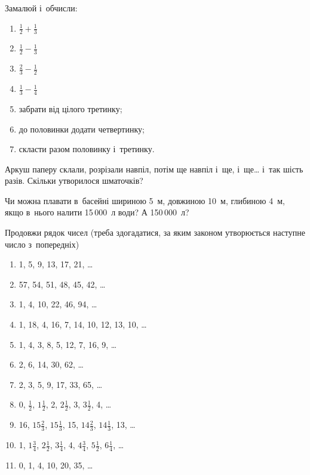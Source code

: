 \problem
Замалюй і~обчисли:
\begin{enumerate}
    \item $\frac{1}{2} + \frac{1}{3}$
    \item $\frac{1}{2} - \frac{1}{3}$
    \item $\frac{2}{3} - \frac{1}{2}$
    \item $\frac{1}{3} - \frac{1}{4}$
    \item забрати від цілого третинку;
    \item до половинки додати четвертинку;
    \item скласти разом половинку і~третинку.
\end{enumerate}


\problem
Аркуш паперу склали, розрізали навпіл, потім ще навпіл і~ще, і~ще\ldots
 і~так шість разів.
Скільки утворилося шматочків?


\problem
Чи можна плавати в~басейні шириною 5~м, довжиною 10~м, глибиною 4~м,
якщо в~нього налити 15\,000~л води? А 150\,000~л?


\problem
Продовжи рядок чисел (треба здогадатися, за яким законом утворюється
наступне число з~попередніх)
\begin{enumerate}
    \item 1, 5, 9, 13, 17, 21, \ldots
    \item 57, 54, 51, 48, 45, 42, \ldots
    \item 1, 4, 10, 22, 46, 94, \ldots
    \item 1, 18, 4, 16, 7, 14, 10, 12, 13, 10, \ldots
    \item 1, 4, 3, 8, 5, 12, 7, 16, 9, \ldots
    \item 2, 6, 14, 30, 62, \ldots
    \item 2, 3, 5, 9, 17, 33, 65, \ldots
    \item 0, $\frac{1}{2}$, $1\frac{1}{2}$,
    2, $2\frac{1}{2}$, 3, $3\frac{1}{2}$, 4, \ldots
    \item 16, $15\frac{2}{3}$, $15\frac{1}{3}$, 15,
    $14\frac{2}{3}$, $14\frac{1}{3}$, 13, \ldots
    \item 1, $1\frac{3}{4}$, $2\frac{1}{2}$, $3\frac{1}{4}$,
    4, $4\frac{3}{4}$, $5\frac{1}{2}$, $6\frac{1}{4}$, \ldots
    \item 0, 1, 4, 10, 20, 35, \ldots 
\end{enumerate}


